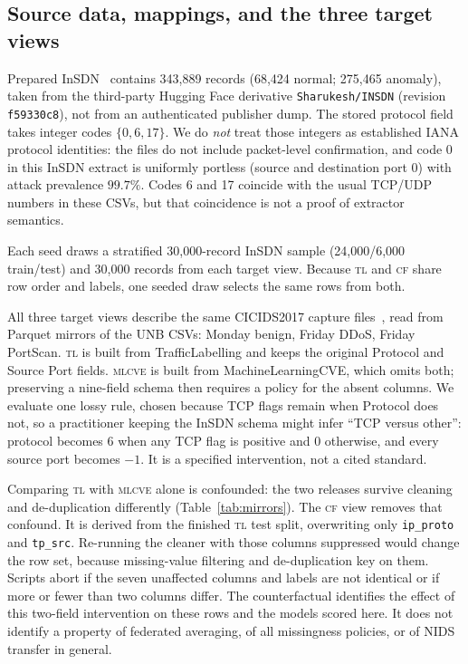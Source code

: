\documentclass[conference,a4paper]{IEEEtran}
\begin{document}
\subsection{Source data, mappings, and the three target views}
Prepared InSDN~\cite{insdn} contains 343,889 records (68,424 normal; 275,465 anomaly), taken from the third-party Hugging Face derivative \texttt{Sharukesh/INSDN} (revision \texttt{f59330c8}), not from an authenticated publisher dump. The stored protocol field takes integer codes $\{0,6,17\}$. We do \emph{not} treat those integers as established IANA protocol identities: the files do not include packet-level confirmation, and code 0 in this InSDN extract is uniformly portless (source and destination port 0) with attack prevalence $99.7\%$. Codes 6 and 17 coincide with the usual TCP/UDP numbers in these CSVs, but that coincidence is not a proof of extractor semantics.

Each seed draws a stratified 30,000-record InSDN sample (24,000/6,000 train/test) and 30,000 records from each target view. Because \textsc{tl} and \textsc{cf} share row order and labels, one seeded draw selects the same rows from both.

All three target views describe the same CICIDS2017 capture files~\cite{cicids}, read from Parquet mirrors of the UNB CSVs: Monday benign, Friday DDoS, Friday PortScan. \textsc{tl} is built from TrafficLabelling and keeps the original Protocol and Source Port fields. \textsc{mlcve} is built from MachineLearningCVE, which omits both; preserving a nine-field schema then requires a policy for the absent columns. We evaluate one lossy rule, chosen because TCP flags remain when Protocol does not, so a practitioner keeping the InSDN schema might infer ``TCP versus other'': protocol becomes 6 when any TCP flag is positive and 0 otherwise, and every source port becomes $-1$. It is a specified intervention, not a cited standard.

Comparing \textsc{tl} with \textsc{mlcve} alone is confounded: the two releases survive cleaning and de-duplication differently (Table~\ref{tab:mirrors}). The \textsc{cf} view removes that confound. It is derived from the finished \textsc{tl} test split, overwriting only \texttt{ip\_proto} and \texttt{tp\_src}. Re-running the cleaner with those columns suppressed would change the row set, because missing-value filtering and de-duplication key on them. Scripts abort if the seven unaffected columns and labels are not identical or if more or fewer than two columns differ. The counterfactual identifies the effect of this two-field intervention on these rows and the models scored here. It does not identify a property of federated averaging, of all missingness policies, or of NIDS transfer in general.
\end{document}
